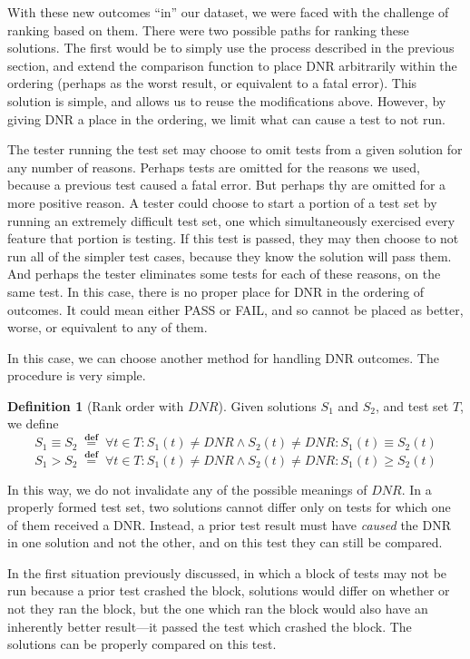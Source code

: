 \documentclass[11pt,twoside]{article}
\newcommand\dnr{\ensuremath{\mathit{DNR}}}
\newcommand\defined{\mathrel{\;\stackrel{\scriptscriptstyle\mathbf{def}}{=}\;}}
\theoremstyle{definition}
\newtheorem{defn}{Definition}
\begin{document}
With these new outcomes ``in'' our dataset, we were faced with the challenge of ranking based on them. There were two possible paths for ranking these solutions. The first would be to simply use the process described in the previous section, and extend the comparison function to place DNR arbitrarily within the ordering (perhaps as the worst result, or equivalent to a fatal error). This solution is simple, and allows us to reuse the modifications above. However, by giving DNR a place in the ordering, we limit what can cause a test to not run.

The tester running the test set may choose to omit tests from a given solution for any number of reasons. Perhaps tests are omitted for the reasons we used, because a previous test caused a fatal error. But perhaps thy are omitted for a more positive reason. A tester could choose to start a portion of a test set by running an extremely difficult test set, one which simultaneously exercised every feature that portion is testing. If this test is passed, they may then choose to not run all of the simpler test cases, because they know the solution will pass them. And perhaps the tester eliminates some tests for each of these reasons, on the same test. In this case, there is no proper place for DNR in the ordering of outcomes. It could mean either PASS or FAIL, and so cannot be placed as better, worse, or equivalent to any of them.

In this case, we can choose another method for handling DNR outcomes. The procedure is very simple.
\begin{defn}[Rank order with \dnr]
Given solutions $S_1$ and $S_2$, and test set $T$, we define
$$S_1 \equiv S_2 \defined \forall t \in T : S_1(t) \neq \dnr \wedge S_2(t) \neq \dnr : S_1(t) \equiv S_2(t)$$
$$S_1 > S_2 \defined \forall t \in T : S_1(t) \neq \dnr \wedge S_2(t) \neq \dnr : S_1(t) \geq S_2(t)$$
\end{defn}
In this way, we do not invalidate any of the possible meanings of \dnr. In a properly formed test set, two solutions cannot differ only on tests for which one of them received a DNR. Instead, a prior test result must have \emph{caused} the DNR in one solution and not the other, and on this test they can still be compared. 

In the first situation previously discussed, in which a block of tests may not be run because a prior test crashed the block, solutions would differ on whether or not they ran the block, but the one which ran the block would also have an inherently better result---it passed the test which crashed the block. The solutions can be properly compared on this test.
\end{document}
